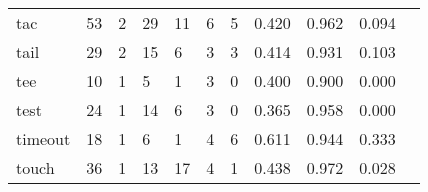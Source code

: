 \begin{longtable}{lp{1.2cm}p{1.2cm}p{1.2cm}p{1.2cm}p{1.2cm}p{1.2cm}p{1.2cm}p{1.2cm}p{1.2cm}p{1.2cm}}
tac       &                                    53 &                                                  2 &                                                 29 &                                                 11 &                                                  6 &                                                  5 &                                              0.420 &                                              0.962 &                                              0.094 \\
tail      &                                    29 &                                                  2 &                                                 15 &                                                  6 &                                                  3 &                                                  3 &                                              0.414 &                                              0.931 &                                              0.103 \\
tee       &                                    10 &                                                  1 &                                                  5 &                                                  1 &                                                  3 &                                                  0 &                                              0.400 &                                              0.900 &                                              0.000 \\
test      &                                    24 &                                                  1 &                                                 14 &                                                  6 &                                                  3 &                                                  0 &                                              0.365 &                                              0.958 &                                              0.000 \\
timeout   &                                    18 &                                                  1 &                                                  6 &                                                  1 &                                                  4 &                                                  6 &                                              0.611 &                                              0.944 &                                              0.333 \\
touch     &                                    36 &                                                  1 &                                                 13 &                                                 17 &                                                  4 &                                                  1 &                                              0.438 &                                              0.972 &                                              0.028 \\

\end{longtable}
